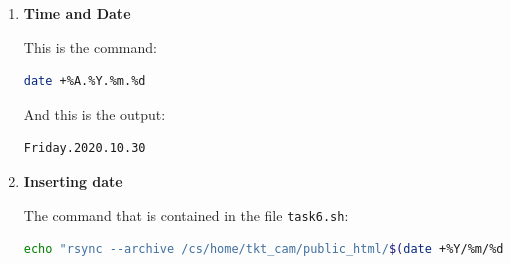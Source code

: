 \documentclass[9pt]{article}
\begin{document}
\begin{enumerate}
\begin{lstlisting}[language=bash,breaklines=true]
# When I execute rsync with --stats it gives me the information on the difference between the two directories
stefvoin@melkki:~/Desktop$ rsync --archive /cs/home/tkt_cam/public_html/2018/12/01/ ShellScripting2020/Week1/ --stats

Number of files: 25 (reg: 24, dir: 1)
Number of created files: 0
Number of deleted files: 0
Number of regular files transferred: 0
Total file size: 9,712,499 bytes
Total transferred file size: 0 bytes
Literal data: 0 bytes
Matched data: 0 bytes
File list size: 0
File list generation time: 0.001 seconds
File list transfer time: 0.000 seconds
Total bytes sent: 555
Total bytes received: 88

sent 555 bytes  received 88 bytes  1,286.00 bytes/sec
total size is 9,712,499  speedup is 15,104.98

# If I delete one file and then I restore it with rsync --stats, I can see that it tells me the information about the operation
stefvoin@melkki:~/Desktop$ rm ShellScripting2020/Week1/201812010000.jpg 
stefvoin@melkki:~/Desktop$ rsync --archive /cs/home/tkt_cam/public_html/2018/12/01/ ShellScripting2020/Week1/ --stats

Number of files: 25 (reg: 24, dir: 1)
Number of created files: 1 (reg: 1)
Number of deleted files: 0
Number of regular files transferred: 1
Total file size: 9,712,499 bytes
Total transferred file size: 369,426 bytes
Literal data: 369,426 bytes
Matched data: 0 bytes
File list size: 0
File list generation time: 0.005 seconds
File list transfer time: 0.000 seconds
Total bytes sent: 370,108
Total bytes received: 107

sent 370,108 bytes  received 107 bytes  740,430.00 bytes/sec
total size is 9,712,499  speedup is 26.23
		\end{lstlisting}

	\item \textbf{Time and Date}
	
		This is the command:
		\begin{lstlisting}[language=bash]
date +%A.%Y.%m.%d 
		\end{lstlisting}
		And this is the output:
		\begin{lstlisting}[language=bash]
Friday.2020.10.30
		\end{lstlisting}
		
	\item \textbf{Inserting date}
	
		The command that is contained in the file \texttt{task6.sh}:
		\begin{lstlisting}[language=bash,breaklines=true]
echo "rsync --archive /cs/home/tkt_cam/public_html/$(date +%Y/%m/%d)/~/ShellScripting2019/Week1/$(date +%A.%Y.%m.%d)"
		\end{lstlisting}
		

\end{enumerate}
\end{document}
